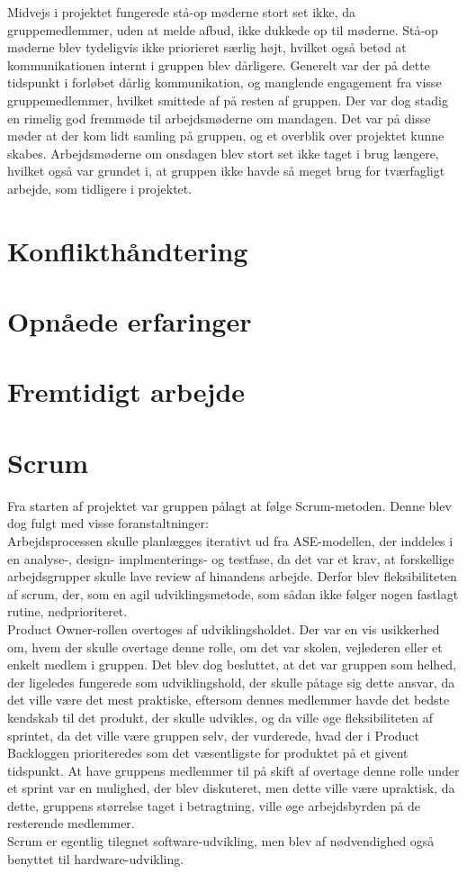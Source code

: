 Midvejs i projektet fungerede stå-op møderne stort set ikke, da gruppemedlemmer, uden at melde afbud, ikke dukkede op til møderne. Stå-op møderne
blev tydeligvis ikke priorieret særlig højt, hvilket også betød at kommunikationen internt i gruppen blev dårligere. Generelt var der på dette tidspunkt i forløbet
dårlig kommunikation, og manglende engagement fra visse gruppemedlemmer, hvilket smittede af på resten af gruppen.
Der var dog stadig en rimelig god fremmøde til arbejdsmøderne om mandagen. Det var på disse møder at der kom lidt samling på gruppen, og et overblik over projektet
kunne skabes. Arbejdsmøderne om onsdagen blev stort set ikke taget i brug længere, hvilket også var grundet i, at gruppen ikke havde så meget brug
for tværfagligt arbejde, som tidligere i projektet.

\section{Konflikthåndtering}

\section{Opnåede erfaringer}

\section*{Fremtidigt arbejde}

\section{Scrum}
Fra starten af projektet var gruppen pålagt at følge Scrum-metoden. Denne blev dog fulgt med visse foranstaltninger:\\
Arbejdsprocessen skulle planlægges iterativt ud fra ASE-modellen, der inddeles i en analyse-, design- implmenterings- og testfase, da det var et krav, at forskellige
arbejdsgrupper skulle lave review af hinandens arbejde. Derfor blev fleksibiliteten af scrum, der, som en agil udviklingsmetode, som sådan ikke følger nogen
fastlagt rutine, nedprioriteret.\\
Product Owner-rollen overtoges af udviklingsholdet. Der var en vis usikkerhed om, hvem der skulle overtage denne rolle, om det var skolen, vejlederen eller et
enkelt medlem i gruppen. Det blev dog besluttet, at det var gruppen som helhed, der ligeledes fungerede som udviklingshold, der skulle påtage sig dette ansvar, da
det ville være det mest praktiske, eftersom dennes medlemmer havde det bedste kendskab til det produkt, der skulle udvikles, og da ville øge fleksibiliteten af
sprintet, da det ville være gruppen selv, der vurderede, hvad der i Product Backloggen prioriteredes som det væsentligste for produktet på et givent tidspunkt.
At have gruppens medlemmer til på skift af overtage denne rolle under et sprint var en mulighed, der blev diskuteret, men dette ville være upraktisk, da dette,
gruppens størrelse taget i betragtning, ville øge arbejdsbyrden på de resterende medlemmer.\\
Scrum er egentlig tilegnet software-udvikling, men blev af nødvendighed også benyttet til hardware-udvikling.


